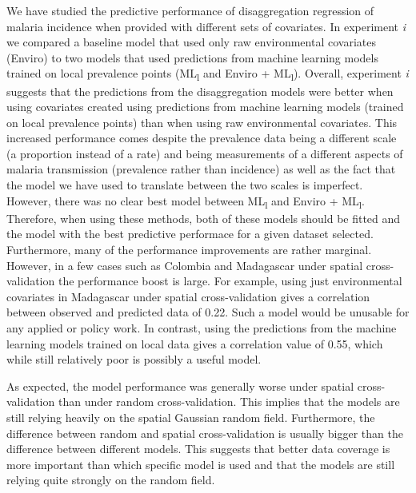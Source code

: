 \documentclass[review]{elsarticle}
\begin{document}
We have studied the predictive performance of disaggregation regression of malaria incidence when provided with different sets of covariates.
In experiment \emph{i} we compared a baseline model that used only raw environmental covariates (Enviro) to two models that used predictions from machine learning models trained on local prevalence points (ML\textsubscript{l} and Enviro + ML\textsubscript{l}).
Overall, experiment \emph{i} suggests that the predictions from the disaggregation models were better when using covariates created using predictions from machine learning models (trained on local prevalence points) than when using raw environmental covariates.
This increased performance comes despite the prevalence data being a different scale (a proportion instead of a rate) and being measurements of a different aspects of malaria transmission (prevalence rather than incidence) as well as the fact that the model we have used to translate between the two scales is imperfect.
However, there was no clear best model between ML\textsubscript{l} and Enviro + ML\textsubscript{l}.
Therefore, when using these methods, both of these models should be fitted and the model with the best predictive performace for a given dataset selected.
Furthermore, many of the performance improvements are rather marginal. 
However, in a few cases such as Colombia and Madagascar under spatial cross-validation the performance boost is large.
For example, using just environmental covariates in Madagascar under spatial cross-validation gives a correlation between observed and predicted data of 0.22.
Such a model would be unusable for any applied or policy work.
In contrast, using the predictions from the machine learning models trained on local data gives a correlation value of 0.55, which while still relatively poor is possibly a useful model.

As expected, the model performance was generally worse under spatial cross-validation than under random cross-validation.
This implies that the models are still relying heavily on the spatial Gaussian random field.
Furthermore, the difference between random and spatial cross-validation is usually bigger than the difference between different models.
This suggests that better data coverage is more important than which specific model is used and that the models are still relying quite strongly on the random field.



\end{document}
